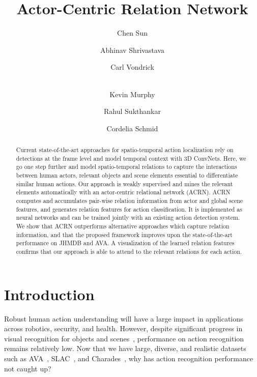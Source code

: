 \documentclass[runningheads]{llncs}
\begin{document}
\title{Actor-Centric Relation Network}


\author{Chen Sun \and Abhinav Shrivastava \and Carl Vondrick \and\\Kevin Murphy \and Rahul Sukthankar \and Cordelia Schmid}


\maketitle

\begin{abstract}
Current state-of-the-art approaches for spatio-temporal action localization rely on detections at the frame level and model temporal context with 3D ConvNets. Here, we go one step further and model spatio-temporal relations to capture the interactions between human actors, relevant objects and scene elements essential to differentiate similar human actions. Our approach is weakly supervised and mines the relevant elements automatically with an actor-centric relational network (ACRN). ACRN computes and accumulates pair-wise relation information from actor and global scene features, and generates relation features for action classification. It is implemented as neural networks and can be trained jointly with an existing action detection system. We show that ACRN outperforms alternative approaches which capture relation information, and that the proposed framework improves upon the state-of-the-art performance on JHMDB and AVA. A visualization of the learned relation features confirms that our approach is able to attend to the relevant relations for each action.


\end{abstract}

\section{Introduction}

Robust human action understanding will have a large impact in applications across robotics, security, and health. However, despite significant progress in visual recognition for objects and scenes~\cite{he2016resnet,krizhevsky2012imagenet,russakovsky2015imagenet,zhou2014learning}, performance on action recognition remains relatively low. Now that we have large, diverse, and realistic datasets such as AVA~\cite{ava_cvpr18}, SLAC~\cite{zhao2017slac}, and Charades~\cite{sigurdsson2016hollywood}, why has action recognition performance not caught up?
\end{document}
